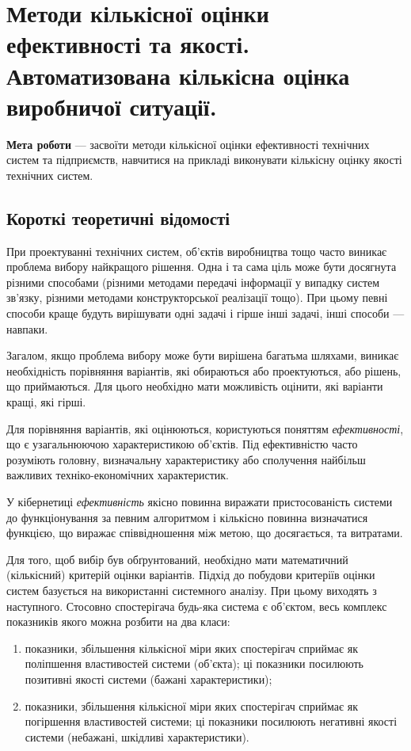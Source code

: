 \chapter{Методи кількісної оцінки ефективності та якості. Автоматизована кількісна оцінка виробничої
ситуації.}

\textbf{Мета роботи} --- засвоїти методи кількісної оцінки ефективності технічних систем та
підприємств, навчитися на прикладі виконувати кількісну оцінку якості технічних систем.

\section{Короткі теоретичні відомості}

При проектуванні технічних систем, об’єктів виробництва тощо часто виникає проблема вибору
найкращого рішення. Одна і та сама ціль може бути досягнута різними способами (різними методами
передачі інформації у випадку систем зв’язку, різними методами конструкторської реалізації
тощо). При цьому певні способи краще будуть вирішувати одні задачі і гірше інші задачі, інші способи
--- навпаки.

Загалом, якщо проблема вибору може бути вирішена багатьма шляхами, виникає необхідність порівняння
варіантів, які обираються або проектуються, або рішень, що приймаються. Для цього необхідно мати
можливість оцінити, які варіанти кращі, які гірші.

Для порівняння варіантів, які оцінюються, користуються поняттям \textit{ефективності}, що є
узагальнюючою характеристикою об’єктів. Під ефективністю часто розуміють головну, визначальну
характеристику або сполучення найбільш важливих техніко-економічних характеристик.

У кібернетиці \textit{ефективність} якісно повинна виражати пристосованість системи до
функціонування за певним алгоритмом і кількісно повинна визначатися функцією, що виражає
співвідношення між метою, що досягається, та витратами.

Для того, щоб вибір був обґрунтований, необхідно мати математичний (кількісний) критерій оцінки
варіантів. Підхід до побудови критеріїв оцінки систем базується на використанні системного
аналізу. При цьому виходять з наступного. Стосовно спостерігача будь-яка система є об'єктом, весь
комплекс показників якого можна розбити на два класи:

\begin{enumerate}
\item показники, збільшення кількісної міри яких спостерігач сприймає як поліпшення властивостей
системи (об’єкта); ці показники посилюють позитивні якості системи (бажані характеристики);
\item показники, збільшення кількісної міри яких спостерігач сприймає як погіршення властивостей
системи; ці показники посилюють негативні якості системи (небажані, шкідливі характеристики).
\end{enumerate}
   
